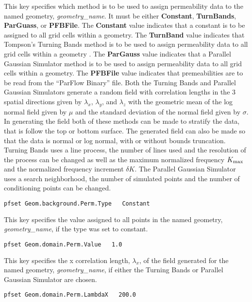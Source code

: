 {
This key specifies which method is to be used to assign permeability
data to the named geometry, {\em geometry\_name}.  It must be either
{\bf Constant}, {\bf TurnBands}, {\bf ParGuass}, or {\bf PFBFile}.  The
{\bf Constant} value indicates that a constant is to be assigned to all
grid cells within a geometry.  The {\bf TurnBand} value indicates that
Tompson's Turning Bands method is to be used to assign permeability data
to all grid cells within a geometry \cite{TAG89}.  
The {\bf ParGauss} value indicates
that a Parallel Gaussian Simulator method is to be used to assign
permeability data to all grid cells within a geometry.  The
{\bf PFBFile} value indicates that premeabilities are to be read from
the ``ParFlow Binary'' file.  Both the Turning Bands and Parallel
Gaussian Simulators generate a random field with correlation lengths
in the $3$ spatial directions given by $\lambda_x$, $\lambda_y$, and
$\lambda_z$ with the geometric mean of the log normal field given by
$\mu$ and the standard deviation of the normal field given by $\sigma$.
In generating the field both of these methods can be made to stratify
the data, that is follow the top or bottom surface.  The generated field
can also be made so that the data is normal or log normal, with or
without bounds truncation.  Turning Bands uses a line process, the
number of lines used and the resolution of the process can be changed as
well as the maximum normalized frequency $K_{\rm max}$ and the normalized
frequency increment $\delta K$.  The Parallel Gaussian Simulator uses
a search neighborhood, the number of simulated points and the number of
conditioning points can be changed.
}
\begin{display}\begin{verbatim}
pfset Geom.background.Perm.Type   Constant
\end{verbatim}\end{display}

{
This key specifies the value assigned to all points in the named
geometry, {\em geometry\_name}, if the type was set to constant.
}
\begin{display}\begin{verbatim}
pfset Geom.domain.Perm.Value   1.0
\end{verbatim}\end{display}

{
This key specifies the x correlation length, $\lambda_x$, of the field
generated for the named geometry, {\em geometry\_name},
if either the Turning Bands or Parallel Gaussian Simulator are
chosen.
}
\begin{display}\begin{verbatim}
pfset Geom.domain.Perm.LambdaX   200.0
\end{verbatim}\end{display}

